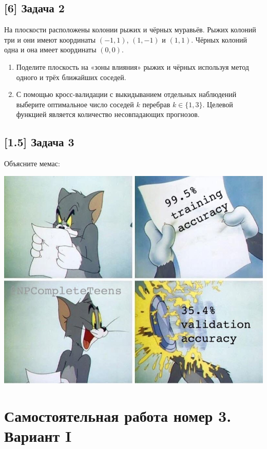 \documentclass[12pt, a4paper, oneside]{article}
\begin{document}
\subsection*{[6] Задача 2}

На плоскости расположены колонии рыжих и чёрных муравьёв. Рыжих колоний три и они имеют координаты $(-1, 1)$, $(1, -1)$ и $(1, 1)$. Чёрных колоний одна и она имеет координаты $(0, 0)$.

\begin{enumerate}
\item Поделите плоскость на «зоны влияния» рыжих и чёрных используя метод одного и трёх ближайших соседей.

\item С помощью кросс-валидации с выкидыванием отдельных наблюдений выберите оптимальное число соседей $k$ перебрав $k \in \{1, 3 \}$. Целевой функцией является количество несовпадающих прогнозов.
\end{enumerate}


\subsection*{[1.5] Задача 3}

Объясните мемас: 

\begin{center}
	\includegraphics[scale=0.3]{memes2.jpg}
\end{center}


\newpage 


\section*{Самостоятельная работа номер 3. Вариант I}
\end{document}
